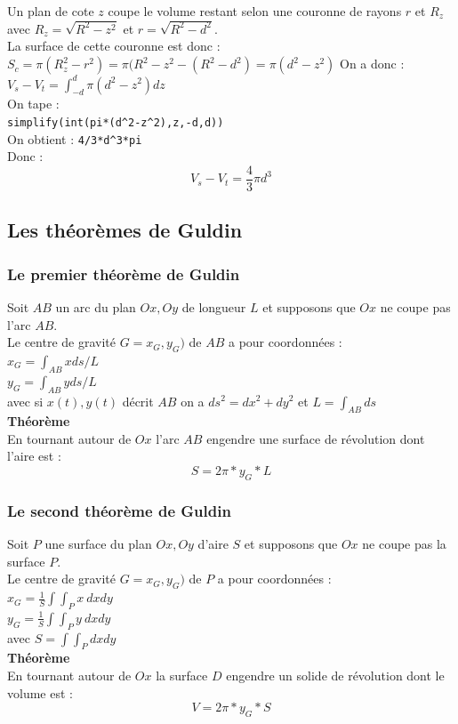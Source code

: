 \documentclass[a4paper,11pt]{book}
\begin{document}
Un plan de cote $z$ coupe le volume restant selon une couronne de rayons $r$ et
$R_z$ avec $R_z=\sqrt{R^2-z^2}$ et $r=\sqrt{R^2-d^2}$.\\
La surface de cette couronne est donc :
$S_c=\pi(R_z^2-r^2)=\pi(R^2-z^2-(R^2-d^2)=\pi(d^2-z^2)$
On a donc :\\
$V_s-V_t=\int_{-d}^d\pi(d^2-z^2)dz$\\
On tape :\\
{\tt simplify(int(pi*(d\verb|^|2-z\verb|^|2),z,-d,d))}\\
On obtient :
{\tt 4/3*d\verb|^|3*pi}\\
Donc :
$$V_s-V_t=\frac{4}{3}\pi d^3$$
\subsection{Les th\'eor\`emes de Guldin}
\subsubsection{Le premier th\'eor\`eme de Guldin}
Soit $AB$ un arc du plan $Ox,Oy$ de longueur $L$ et supposons que $Ox$ ne 
coupe pas l'arc $AB$.\\
Le centre de gravit\'e $G=x_G,y_G)$ de $AB$ a pour coordonn\'ees :\\
$x_G=\int_{AB}xds/L$\\
$y_G=\int_{AB}yds/L$\\
avec si $x(t),y(t)$ d\'ecrit $AB$ on a $ds^2=dx^2+dy^2$ et $L=\int_{AB}ds$ \\
{\bf Th\'eor\`eme} \\
En tournant autour de $Ox$ l'arc $AB$ engendre une surface de r\'evolution dont 
l'aire est :
$$S=2\pi*y_G*L$$
\subsubsection{Le second th\'eor\`eme de Guldin}
Soit $P$ une surface du plan $Ox,Oy$ d'aire $S$ et  supposons que $Ox$ ne 
coupe pas la surface $P$.\\
Le centre de gravit\'e $G=x_G,y_G)$ de $P$ a pour coordonn\'ees :\\
$x_G=\frac{1}{S}\int\int_{P}x\ dxdy$\\
$y_G=\frac{1}{S}\int\int_{P}y\ dxdy$\\ 
avec $S=\int\int_P dxdy$\\
{\bf Th\'eor\`eme} \\
En tournant autour de $Ox$ la surface $D$ engendre un solide de r\'evolution 
dont le volume est :
$$V=2\pi*y_G*S$$
\end{document}
